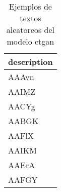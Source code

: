\begin{table}[H]
\centering
\fontsize{8}{14}\selectfont
\caption{Ejemplos de textos aleatoreos del modelo ctgan}
\label{table-sample10-economicos-a-1-ctgan-text}
\begin{tabular}{|m{45em}|}
\hline
\rowcolor[gray]{0.8}
description \\
\hline AAAvn \\
\hline AAIMZ \\
\hline AACYg \\
\hline AABGK \\
\hline AAFlX \\
\hline AAIKM \\
\hline AAErA \\
\hline AAFGY \\
\hline
\end{tabular}
\end{table}
